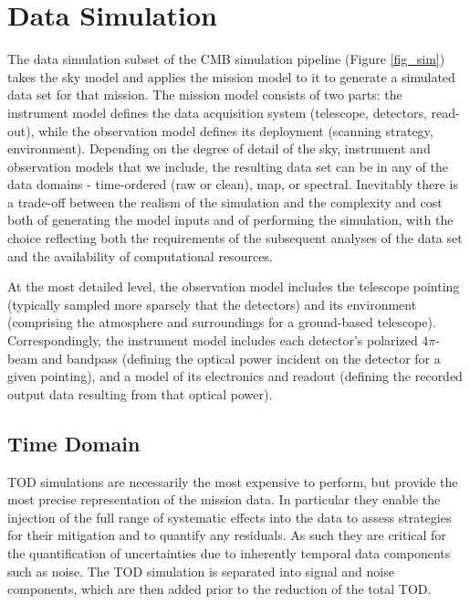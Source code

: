  
\section{Data Simulation}
\label{sec_datasim}

The data simulation subset of the CMB simulation pipeline (Figure \ref{fig_sim}) takes the sky model and applies the mission model to it to generate a simulated data set for that mission. The mission model consists of two parts: the instrument model defines the data acquisition system (telescope, detectors, read-out), while the observation model defines its deployment (scanning strategy, environment). Depending on the degree of detail of the sky, instrument and observation models that we include, the resulting data set can be in any of the data domains - time-ordered (raw or clean), map, or spectral. Inevitably there is a trade-off between the realism of the simulation and the complexity and cost both of generating the model inputs and of performing the simulation, with the choice reflecting both the requirements of the subsequent analyses of the data set and the availability of computational resources.

At the most detailed level, the observation model includes the telescope pointing (typically sampled more sparsely that the detectors) and its environment (comprising the atmosphere and surroundings for a ground-based telescope). Correspondingly, the instrument model includes each detector's polarized $4 \pi$-beam and bandpass (defining the optical power incident on the detector for a given pointing), and a model of its electronics and readout (defining the recorded output data resulting from that optical power).

\subsection{Time Domain}

TOD simulations are necessarily the most expensive to perform, but provide the most precise representation of the mission data. In particular they enable the injection of the full range of systematic effects into the data to assess strategies for their mitigation and to quantify any residuals. As such they are critical for the quantification of uncertainties due to inherently temporal data components such as noise. The TOD simulation is separated into signal and noise components, which are then added prior to the reduction of the total TOD.

